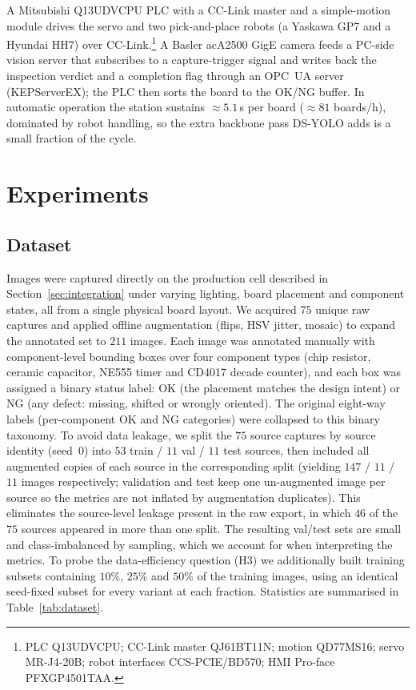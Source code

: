 \documentclass[conference]{IEEEtran}
\begin{document}
A Mitsubishi Q13UDVCPU PLC with a CC-Link master and a simple-motion module
drives the servo and two pick-and-place robots (a Yaskawa GP7 and a Hyundai HH7)
over CC-Link.\footnote{PLC Q13UDVCPU; CC-Link master QJ61BT11N; motion QD77MS16;
servo MR-J4-20B; robot interfaces CCS-PCIE/BD570; HMI Pro-face PFXGP4501TAA.} A
Basler acA2500 GigE camera feeds a PC-side vision server that subscribes to a
capture-trigger signal and writes back the inspection verdict and a completion
flag through an OPC~UA server (KEPServerEX); the PLC then sorts the board to the
OK/NG buffer. In automatic operation the station sustains ${\approx}5.1$\,s per
board (${\approx}81$ boards/h), dominated by robot handling, so the extra
backbone pass DS-YOLO adds is a small fraction of the cycle.

\section{Experiments}
\label{sec:exp}

\subsection{Dataset}
\label{sec:dataset}
Images were captured directly on the production cell described in
Section~\ref{sec:integration} under varying lighting, board placement and
component states, all from a single physical board layout. We acquired $75$
unique raw captures and applied offline augmentation (flips, HSV jitter, mosaic)
to expand the annotated set to $211$ images. Each image was annotated manually
with component-level bounding boxes over four component types (chip resistor,
ceramic capacitor, NE555 timer and CD4017 decade counter), and each box was
assigned a binary status label: OK (the placement matches the design intent) or
NG (any defect: missing, shifted or wrongly oriented). The original eight-way
labels (per-component OK and NG categories) were collapsed to this binary
taxonomy. To avoid data leakage, we split the $75$ source captures by source
identity (seed~$0$) into $53$ train / $11$ val / $11$ test sources, then included
all augmented copies of each source in the corresponding split (yielding $147$ /
$11$ / $11$ images respectively; validation and test keep one un-augmented image
per source so the metrics are not inflated by augmentation duplicates). This
eliminates the source-level leakage present in the raw export, in which $46$ of
the $75$ sources appeared in more than one split. The resulting val/test sets are
small and class-imbalanced by sampling, which we account for when interpreting
the metrics. To probe the data-efficiency question (H3) we additionally built
training subsets containing $10\%$, $25\%$ and $50\%$ of the training images,
using an identical seed-fixed subset for every variant at each fraction.
Statistics are summarised in Table~\ref{tab:dataset}.
\end{document}
